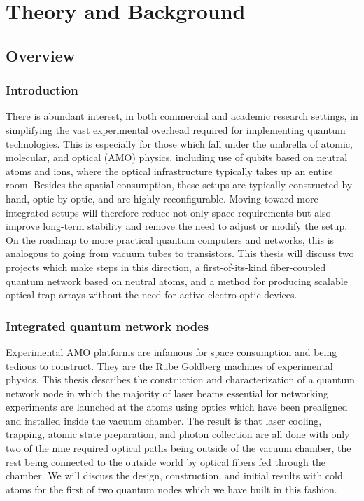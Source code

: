 \part{Theory and Background}\label{part:theory}
\chapter{Overview}\label{ch:overview}

\section{Introduction}
There is abundant interest, in both commercial and academic research settings, in simplifying the vast experimental overhead required for implementing quantum technologies. This is especially for those which fall under the umbrella of atomic, molecular, and optical (AMO) physics, including use of qubits based on neutral atoms and ions, where the optical infrastructure typically takes up an entire room. Besides the spatial consumption, these setups are typically constructed by hand, optic by optic, and are highly reconfigurable. Moving toward more integrated setups will therefore reduce not only space requirements but also improve long-term stability and remove the need to adjust or modify the setup. On the roadmap to more practical quantum computers and networks, this is analogous to going from vacuum tubes to transistors. This thesis will discuss two projects which make steps in this direction, a first-of-its-kind fiber-coupled quantum network based on neutral atoms, and a method for producing scalable optical trap arrays without the need for active electro-optic devices. 

\section{Integrated quantum network nodes}
Experimental AMO platforms are infamous for space consumption and being tedious to construct. They are the Rube Goldberg machines of experimental physics. This thesis describes the construction and characterization of a quantum network node in which the majority of laser beams essential for networking experiments are launched at the atoms using optics which have been prealigned and installed inside the vacuum chamber. The result is that laser cooling, trapping, atomic state preparation, and photon collection are all done with only two of the nine required optical paths being outside of the vacuum chamber, the rest being connected to the outside world by optical fibers fed through the chamber. We will discuss the design, construction, and initial results with cold atoms for the first of two quantum nodes which we have built in this fashion.

